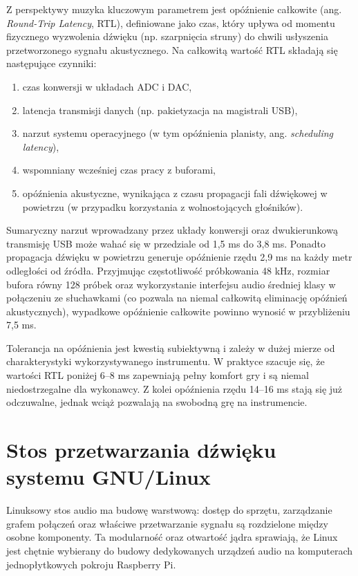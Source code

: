 \documentclass[12pt,a4paper]{report}
\begin{document}
Z perspektywy muzyka kluczowym parametrem jest opóźnienie całkowite
(ang. \textit{Round-Trip Latency}, RTL), definiowane jako czas, który
upływa od momentu fizycznego wyzwolenia dźwięku (np. szarpnięcia
struny) do chwili usłyszenia przetworzonego sygnału
akustycznego\cite{audio_latency}. Na
całkowitą wartość RTL składają się następujące
czynniki\cite{audio_latency_components}:

\begin{enumerate}
  \item czas konwersji w układach ADC i DAC,
  \item latencja transmisji danych (np. pakietyzacja na magistrali USB),
  \item narzut systemu operacyjnego (w tym opóźnienia planisty, ang.
    \textit{scheduling latency}),
  \item wspomniany wcześniej czas pracy z buforami,
  \item opóźnienia akustyczne, wynikająca z czasu propagacji fali
    dźwiękowej w powietrzu (w przypadku korzystania z wolnostojących głośników).
\end{enumerate}

Sumaryczny narzut wprowadzany przez układy konwersji oraz
dwukierunkową transmisję USB może wahać się w przedziale od 1,5 ms do
3,8 ms\cite{audio_intetface_overhead}. Ponadto propagacja dźwięku w
powietrzu generuje opóźnienie rzędu 2,9 ms na każdy metr odległości
od źródła. Przyjmując częstotliwość próbkowania 48 kHz, rozmiar
bufora równy 128 próbek oraz wykorzystanie interfejsu audio średniej
klasy w połączeniu ze słuchawkami (co pozwala na niemal całkowitą
  eliminację opóźnień
akustycznych), wypadkowe opóźnienie całkowite powinno wynosić w
przybliżeniu 7,5 ms.

Tolerancja na opóźnienia jest kwestią subiektywną i zależy w dużej
mierze od charakterystyki wykorzystywanego instrumentu. W praktyce
szacuje się, że wartości RTL poniżej 6–8 ms zapewniają pełny komfort
gry i są niemal niedostrzegalne dla wykonawcy. Z kolei opóźnienia
rzędu 14–16 ms stają się już odczuwalne, jednak wciąż pozwalają na
swobodną grę na instrumencie\cite{perception_of_latency}.

\section{Stos przetwarzania dźwięku systemu GNU/Linux}

Linuksowy stos audio ma budowę warstwową: dostęp do sprzętu,
zarządzanie grafem połączeń oraz właściwe przetwarzanie sygnału są
rozdzielone między osobne komponenty. Ta modularność oraz otwartość
jądra sprawiają, że Linux jest chętnie wybierany do budowy
dedykowanych urządzeń audio na komputerach jednopłytkowych pokroju Raspberry Pi.
\end{document}
